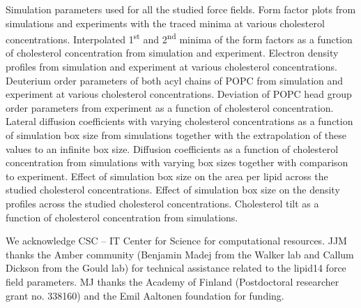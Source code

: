 \documentclass[journal=jctcce]{achemso}
\begin{document}
\begin{suppinfo}
Simulation parameters used for all the studied force fields.
%
Form factor plots from simulations and experiments with the traced minima at various cholesterol concentrations.
%
Interpolated 1\textsuperscript{st} and 2\textsuperscript{nd} minima of the form factors as a function of cholesterol concentration from simulation and experiment.
%
Electron density profiles from simulation and experiment at various cholesterol concentrations.
%
Deuterium order parameters of both acyl chains of POPC from simulation and experiment at various cholesterol concentrations.
%
Deviation of POPC head group order parameters from experiment as a function of cholesterol concentration.
%
Lateral diffusion coefficients with varying cholesterol concentrations as a function of simulation box size from simulations together with the extrapolation of these values to an infinite box size.
%
Diffusion coefficients as a function of cholesterol concentration from simulations with varying box sizes together with comparison to experiment.
%
Effect of simulation box size on the area per lipid across the studied cholesterol concentrations.
%
Effect of simulation box size on the density profiles across the studied cholesterol concentrations.
%
Cholesterol tilt as a function of cholesterol concentration from simulations.
\end{suppinfo}

\begin{acknowledgement}
We acknowledge CSC -- IT Center for Science for computational resources.
%
JJM thanks the Amber community (Benjamin Madej from the Walker lab and Callum Dickson from the Gould lab) for technical assistance related to the lipid14 force field parameters. 
%
MJ thanks the Academy of Finland (Postdoctoral researcher grant no. 338160) and the Emil Aaltonen foundation for funding.
\end{acknowledgement}




\listoftodos
\end{document}
